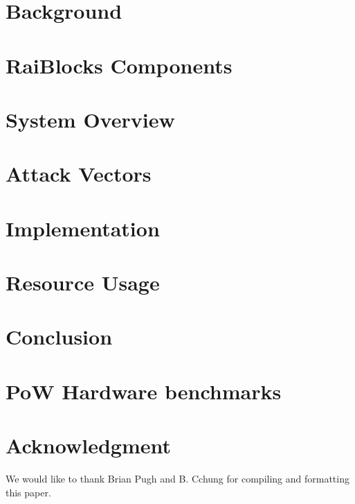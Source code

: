 \documentclass[journal]{IEEEtran}
\begin{document}
\section{Background}


\section{RaiBlocks Components}


\section{System Overview}


\section{Attack Vectors}


\section{Implementation}


\section{Resource Usage}


\section{Conclusion}


\appendices
\section{PoW Hardware benchmarks} \label{sec:pow_hardware_benchmarks}




\section*{Acknowledgment}
We would like to thank Brian Pugh and B. Cchung for compiling and formatting this paper.
\end{document}

